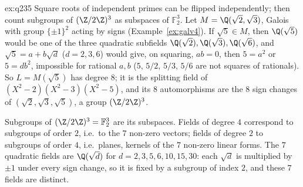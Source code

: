 \begin{solution}{ex:q235}
\idea Square roots of independent primes can be flipped independently; then count subgroups of $(\Z/2\Z)^3$ as subspaces of $\mathbb F_2^3$.
\writeup Let $M=\Q(\sqrt2,\sqrt3)$, Galois with group $\{\pm1\}^2$ acting by signs (Example~\ref{ex:galv4}). If $\sqrt5\in M$, then $\Q(\sqrt5)$ would be one of the three quadratic subfields $\Q(\sqrt2),\Q(\sqrt3),\Q(\sqrt6)$, and $\sqrt5=a+b\sqrt d$ ($d=2,3,6$) would give, on squaring, $ab=0$, then $5=a^2$ or $5=db^2$, impossible for rational $a,b$ ($5$, $5/2$, $5/3$, $5/6$ are not squares of rationals). So $L=M(\sqrt5)$ has degree $8$; it is the splitting field of $(X^2-2)(X^2-3)(X^2-5)$, and its $8$ automorphisms are the $8$ sign changes of $(\sqrt2,\sqrt3,\sqrt5)$, a group $(\Z/2\Z)^3$.

Subgroups of $(\Z/2\Z)^3=\mathbb F_2^3$ are its subspaces. Fields of degree $4$ correspond to subgroups of order $2$, i.e.\ to the $7$ non-zero vectors; fields of degree $2$ to subgroups of order $4$, i.e.\ planes, kernels of the $7$ non-zero linear forms. The $7$ quadratic fields are $\Q(\sqrt d)$ for $d=2,3,5,6,10,15,30$: each $\sqrt d$ is multiplied by $\pm1$ under every sign change, so it is fixed by a subgroup of index $2$, and these $7$ fields are distinct.
\end{solution}

